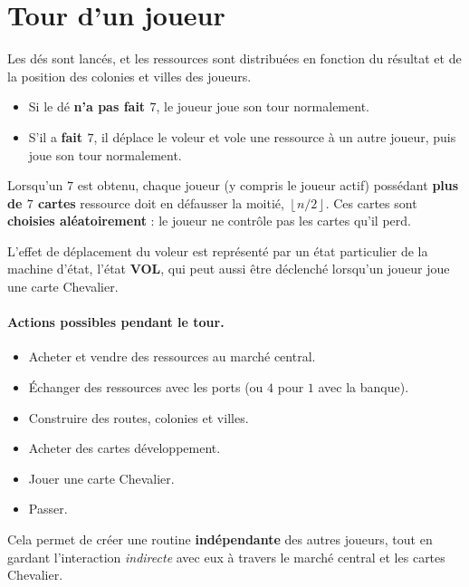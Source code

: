 \documentclass[11pt,a4paper]{article}
\begin{document}
\section{Tour d'un joueur}

Les dés sont lancés, et les ressources sont distribuées en fonction du résultat et de
la position des colonies et villes des joueurs.

\begin{itemize}[nosep]
  \item Si le dé \textbf{n'a pas fait $7$}, le joueur joue son tour normalement.
  \item S'il a \textbf{fait $7$}, il déplace le voleur et vole une ressource à un
        autre joueur, puis joue son tour normalement.
\end{itemize}

\begin{remarque}
Lorsqu'un $7$ est obtenu, chaque joueur (y compris le joueur actif) possédant
\textbf{plus de $7$ cartes} ressource doit en défausser la moitié,
$\left\lfloor n/2 \right\rfloor$. Ces cartes sont \textbf{choisies aléatoirement} : le
joueur ne contrôle pas les cartes qu'il perd.
\end{remarque}

L'effet de déplacement du voleur est représenté par un état particulier de la machine
d'état, l'état \textbf{VOL}, qui peut aussi être déclenché lorsqu'un joueur joue une
carte Chevalier.

\paragraph{Actions possibles pendant le tour.}
\begin{itemize}[nosep]
  \item Acheter et vendre des ressources au marché central.
  \item Échanger des ressources avec les ports (ou $4$ pour $1$ avec la banque).
  \item Construire des routes, colonies et villes.
  \item Acheter des cartes développement.
  \item Jouer une carte Chevalier.
  \item Passer.
\end{itemize}

Cela permet de créer une routine \textbf{indépendante} des autres joueurs, tout en
gardant l'interaction \emph{indirecte} avec eux à travers le marché central et les
cartes Chevalier.
\end{document}
